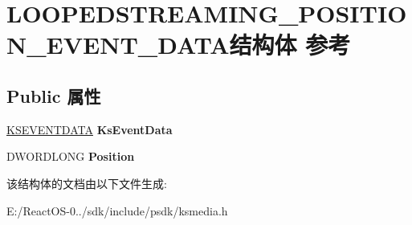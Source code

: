 \hypertarget{struct_l_o_o_p_e_d_s_t_r_e_a_m_i_n_g___p_o_s_i_t_i_o_n___e_v_e_n_t___d_a_t_a}{}\section{L\+O\+O\+P\+E\+D\+S\+T\+R\+E\+A\+M\+I\+N\+G\+\_\+\+P\+O\+S\+I\+T\+I\+O\+N\+\_\+\+E\+V\+E\+N\+T\+\_\+\+D\+A\+T\+A结构体 参考}
\label{struct_l_o_o_p_e_d_s_t_r_e_a_m_i_n_g___p_o_s_i_t_i_o_n___e_v_e_n_t___d_a_t_a}
\subsection*{Public 属性}
\begin{DoxyCompactItemize}
\item 
\mbox{\label{struct_l_o_o_p_e_d_s_t_r_e_a_m_i_n_g___p_o_s_i_t_i_o_n___e_v_e_n_t___d_a_t_a_a33f69e0f7cdbdea1cc86069d95737768}} 
\hyperlink{struct_k_s_e_v_e_n_t_d_a_t_a}{K\+S\+E\+V\+E\+N\+T\+D\+A\+TA} {\bfseries Ks\+Event\+Data}
\item 
\mbox{\label{struct_l_o_o_p_e_d_s_t_r_e_a_m_i_n_g___p_o_s_i_t_i_o_n___e_v_e_n_t___d_a_t_a_acec6802391ed7ff6fce5591a1106d7c2}} 
D\+W\+O\+R\+D\+L\+O\+NG {\bfseries Position}
\end{DoxyCompactItemize}


该结构体的文档由以下文件生成\+:\begin{DoxyCompactItemize}
\item 
E\+:/\+React\+O\+S-\/0../sdk/include/psdk/ksmedia.\+h\end{DoxyCompactItemize}
